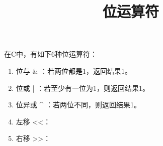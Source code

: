 \documentclass[10pt,a4paper%
tablecaptionabove]{article}
\def\tf{\ttfamily}
\begin{document}
\begin{CJK}{UTF8}{gkai}
 

\newtheorem{li}{例}
\newtheorem{jielun}{结论}
\newtheorem{dingli}{定理}
\newtheorem{mingti}{{命题}} 
\newtheorem{yinli}{{引理}} 
\newtheorem{tuilun}{{推论}}
\newtheorem{dingyi}{{定义}} 
\newtheorem{example}{{例}}
\newtheorem*{example*}{{例}}
\newtheorem*{jie}{{解}}
\newtheorem*{zhengming}{{证明}}
\newtheorem{zhu}{{注}}
\newtheorem*{zhu*}{{注}}
\newtheorem{xingzhi}{{性质}}
\newtheorem{wenti}{{问题}}
\newtheorem{rem}{{Remark}}
\newtheorem{lem}{{Lemma}}
\pagestyle{plain}


\title{位运算符}
\maketitle

在C中，有如下6种位运算符：
\begin{enumerate}
\item 位与 { \tf \&} ：若两位都是1，返回结果1。
\item 位或 { \tf |} ：若至少有一位为1，则返回结果1。
\item 位异或 { \tf \^{}} ：若两位不同，则返回结果1。
\item 左移 {\tf <<}：
\item 右移 {\tf >>}：




\end{enumerate}




\end{CJK}
\end{document}
